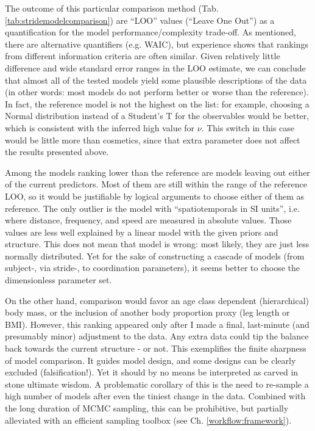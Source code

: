 The outcome of this particular comparison method (Tab. \ref{tab:stridemodelcomparison}) are ``LOO'' values (``Leave One Out'') as a quantification for the model performance/complexity trade-off.
As mentioned, there are alternative quantifiers (e.g. WAIC), but experience shows that rankings from different information criteria are often similar.
Given relatively little difference and wide standard error ranges in the LOO estimate, we can conclude that almost all of the tested models yield some plausible descriptions of the data (in other words: most models do not perform  better or worse than the reference).
In fact, the reference model is not the highest on the list: for example, choosing a Normal distribution instead of a Student's T for the observables would be better, which is consistent with the inferred high value for \(\nu\).
This switch in this case would be little more than cosmetics, since that extra parameter does not affect the results presented above.

Among the models ranking lower than the reference are models leaving out either of the current predictors.
Most of them are still within the range of the reference LOO, so it would be justifiable by logical arguments to choose either of them as reference.
The only outlier is the model with ``spatiotemporals in SI units'', i.e. where distance, frequency, and speed are measured in absolute values.
Those values are less well explained by a linear model with the given priors and structure.
This does not mean that model is wrong: most likely, they are just less normally distributed.
Yet for the sake of constructing a cascade of models (from subject-, via stride-, to coordination parameters), it seems better to choose the dimensionless parameter set.


On the other hand, comparison would favor an age class dependent (hierarchical) body mass, or the inclusion of another body proportion proxy (leg length or BMI).
However, this ranking appeared only after I made a final, last-minute (and presumably minor) adjustment to the data.
Any extra data could tip the balance back towards the current structure - or not.
This exemplifies the finite sharpness of model comparison.
It guides model design, and some designs can be clearly excluded (falsification!).
Yet it should by no means be interpreted as carved in stone ultimate wisdom.
A problematic corollary of this is the need to re-sample a high number of models after even the tiniest change in the data.
Combined with the long duration of MCMC sampling, this can be prohibitive, but partially alleviated with an efficient sampling toolbox (see Ch. \ref{workflow:framework}).


